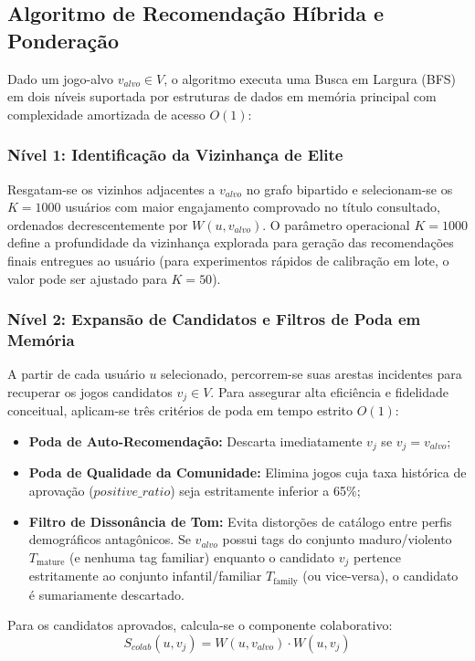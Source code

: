\documentclass[conference]{IEEEtran}
\begin{document}
\subsection{Algoritmo de Recomendação Híbrida e Ponderação}
Dado um jogo-alvo $v_{alvo} \in V$, o algoritmo executa uma Busca em Largura (BFS) em dois níveis suportada por estruturas de dados em memória principal com complexidade amortizada de acesso $O(1)$:

\subsubsection{Nível 1: Identificação da Vizinhança de Elite}
Resgatam-se os vizinhos adjacentes a $v_{alvo}$ no grafo bipartido e selecionam-se os $K = 1000$ usuários com maior engajamento comprovado no título consultado, ordenados decrescentemente por $W(u, v_{alvo})$. O parâmetro operacional $K = 1000$ define a profundidade da vizinhança explorada para geração das recomendações finais entregues ao usuário (para experimentos rápidos de calibração em lote, o valor pode ser ajustado para $K = 50$).

\subsubsection{Nível 2: Expansão de Candidatos e Filtros de Poda em Memória}
A partir de cada usuário $u$ selecionado, percorrem-se suas arestas incidentes para recuperar os jogos candidatos $v_j \in V$. Para assegurar alta eficiência e fidelidade conceitual, aplicam-se três critérios de poda em tempo estrito $O(1)$:
\begin{itemize}
    \item \textbf{Poda de Auto-Recomendação:} Descarta imediatamente $v_j$ se $v_j = v_{alvo}$;
    \item \textbf{Poda de Qualidade da Comunidade:} Elimina jogos cuja taxa histórica de aprovação ($positive\_ratio$) seja estritamente inferior a 65\%;
    \item \textbf{Filtro de Dissonância de Tom:} Evita distorções de catálogo entre perfis demográficos antagônicos. Se $v_{alvo}$ possui tags do conjunto maduro/violento $T_{\text{mature}}$ (e nenhuma tag familiar) enquanto o candidato $v_j$ pertence estritamente ao conjunto infantil/familiar $T_{\text{family}}$ (ou vice-versa), o candidato é sumariamente descartado.
\end{itemize}

Para os candidatos aprovados, calcula-se o componente colaborativo:
\begin{equation}
S_{colab}(u, v_j) = W(u, v_{alvo}) \cdot W(u, v_j)
\end{equation}
\end{document}
